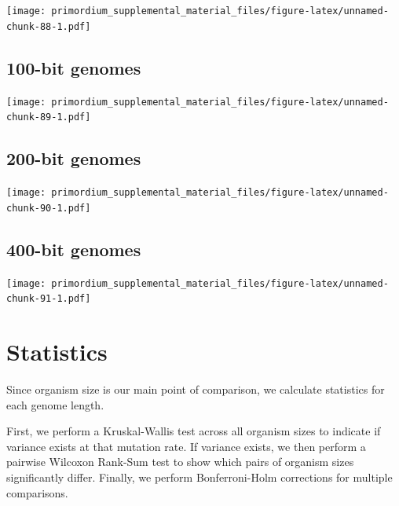 \documentclass[
]{book}
\begin{document}
\texttt{[image: primordium\_supplemental\_material\_files/figure-latex/unnamed-chunk-88-1.pdf]}

\hypertarget{bit-genomes-2}{%
\subsection{100-bit genomes}\label{bit-genomes-2}}

\texttt{[image: primordium\_supplemental\_material\_files/figure-latex/unnamed-chunk-89-1.pdf]}

\hypertarget{bit-genomes-3}{%
\subsection{200-bit genomes}\label{bit-genomes-3}}

\texttt{[image: primordium\_supplemental\_material\_files/figure-latex/unnamed-chunk-90-1.pdf]}

\hypertarget{bit-genomes-4}{%
\subsection{400-bit genomes}\label{bit-genomes-4}}

\texttt{[image: primordium\_supplemental\_material\_files/figure-latex/unnamed-chunk-91-1.pdf]}

\hypertarget{statistics-5}{%
\section{Statistics}\label{statistics-5}}

Since organism size is our main point of comparison, we calculate statistics for each genome length.

First, we perform a Kruskal-Wallis test across all organism sizes to indicate if variance exists at that mutation rate.
If variance exists, we then perform a pairwise Wilcoxon Rank-Sum test to show which pairs of organism sizes significantly differ.
Finally, we perform Bonferroni-Holm corrections for multiple comparisons.
\end{document}
